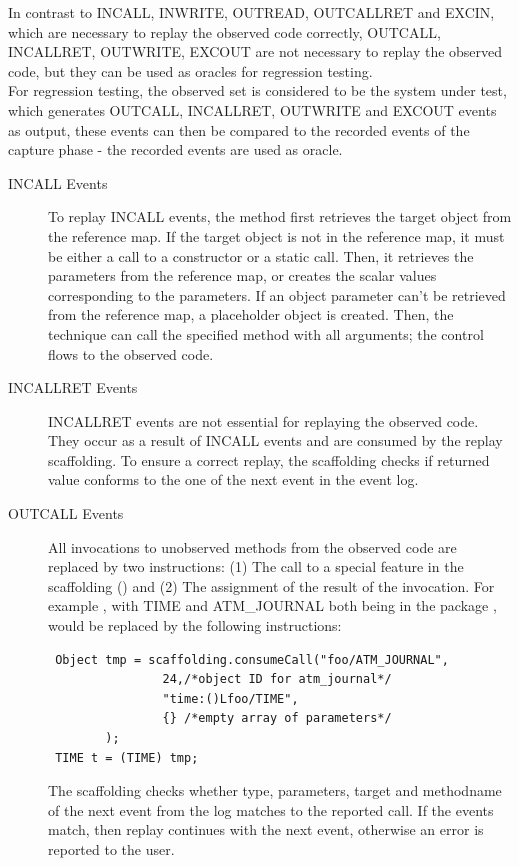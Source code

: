 In contrast to INCALL, INWRITE, OUTREAD, OUTCALLRET and EXCIN, which are necessary to replay the observed code correctly, OUTCALL, INCALLRET, OUTWRITE, EXCOUT are not necessary to replay the observed code, but they can be used as oracles for regression testing. \\
For regression testing, the observed set is considered to be the system under test, which generates OUTCALL, INCALLRET, OUTWRITE and EXCOUT events as output, these events can then be compared to the recorded events of the capture phase - the recorded events are used as oracle.

\begin{description}
 \item [INCALL Events] To replay INCALL events, the method first retrieves the target object from the reference map. If the target object is not in the reference map, it must be either a call to a constructor or a static call. Then, it retrieves the parameters from the reference map, or creates the scalar values corresponding to the parameters. If an object parameter can't be retrieved from the reference map, a placeholder object is created. Then, the technique can call the specified method with all arguments; the control flows to the observed code. 
 \item [INCALLRET Events] INCALLRET events are not essential for replaying the observed code. They occur as a result of INCALL events and are consumed by the replay scaffolding. To ensure a correct replay, the scaffolding checks if returned value conforms to the one of the next event in the event log.
 \item [OUTCALL Events] All invocations to unobserved methods from the observed code are replaced by two instructions: (1) The call to a special feature in the scaffolding () and (2) The assignment of the result of the invocation. For example , with TIME and ATM\_JOURNAL both being in the package , would be replaced by the following instructions:
\begin{lstlisting}
 Object tmp = scaffolding.consumeCall("foo/ATM_JOURNAL",
                24,/*object ID for atm_journal*/
                "time:()Lfoo/TIME",
                {} /*empty array of parameters*/
		);
 TIME t = (TIME) tmp;
\end{lstlisting}
The scaffolding checks whether type, parameters, target and methodname of the next event from the log matches to the reported call. If the events match, then replay continues with the next event, otherwise an error is reported to the user.

\end{description}
